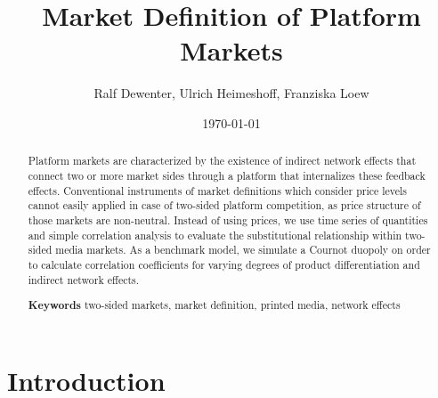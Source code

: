 \documentclass[12pt,a4paper,notitlepage]{article}
\title{Market Definition of Platform Markets}
\date{\today}
\author{Ralf Dewenter, Ulrich Heimeshoff, Franziska Loew}
\begin{document}
\begin{titlepage}
	\maketitle
	\begin{abstract}
		Platform markets are characterized by the existence of indirect network effects that connect two or more market sides through a platform that internalizes these feedback effects. Conventional instruments of market definitions which consider price levels cannot easily applied in case of two-sided platform competition, as price structure of those markets are non-neutral. Instead of using prices, we use time series of quantities and simple correlation analysis to evaluate the substitutional relationship within two-sided media markets. As a benchmark model, we simulate a Cournot duopoly on order to calculate correlation coefficients for varying degrees of product differentiation and indirect network effects.
		
		\textbf{Keywords} two-sided markets, market definition, printed media, network effects

	\end{abstract}

\end{titlepage}


\section{Introduction}
\end{document}
